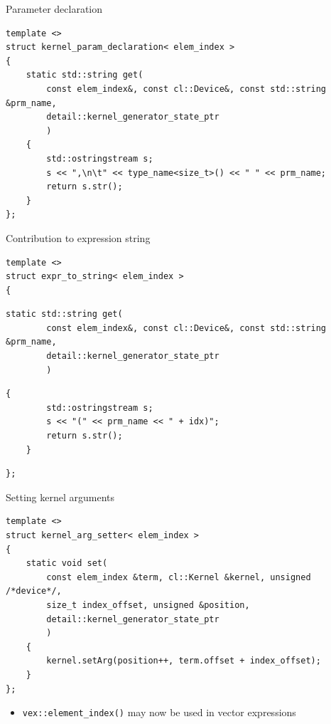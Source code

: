 \documentclass[@BEAMER_OPTIONS@]{beamer}
\newcommand{\code}[1]{\lstinline|#1|}
\begin{document}
\begin{frame}[fragile]{Parameter declaration}
    \begin{exampleblock}{}
        \begin{lstlisting}
template <>
struct kernel_param_declaration< elem_index >
{
    static std::string get(
        const elem_index&, const cl::Device&, const std::string &prm_name,
        detail::kernel_generator_state_ptr
        )
    {
        std::ostringstream s;
        s << ",\n\t" << type_name<size_t>() << " " << prm_name;
        return s.str();
    }
};
        \end{lstlisting}
    \end{exampleblock}
\end{frame}

\note{ }

\begin{frame}[fragile]{Contribution to expression string}
    \begin{exampleblock}{}
            \begin{lstlisting}
template <>
struct expr_to_string< elem_index >
{
    \end{lstlisting}
    \begin{lstlisting}[firstnumber=last]
    static std::string get(
        const elem_index&, const cl::Device&, const std::string &prm_name,
        detail::kernel_generator_state_ptr
        )
    \end{lstlisting}
    \begin{lstlisting}[firstnumber=last]
    {
        std::ostringstream s;
        s << "(" << prm_name << " + idx)";
        return s.str();
    }
    \end{lstlisting}
    \begin{lstlisting}[firstnumber=last]
};
            \end{lstlisting}
    \end{exampleblock}
\end{frame}

\note{ }

\begin{frame}[fragile]{Setting kernel arguments}
    \begin{exampleblock}{}
        \begin{lstlisting}
template <>
struct kernel_arg_setter< elem_index >
{
    static void set(
        const elem_index &term, cl::Kernel &kernel, unsigned /*device*/,
        size_t index_offset, unsigned &position,
        detail::kernel_generator_state_ptr
        )
    {
        kernel.setArg(position++, term.offset + index_offset);
    }
};
        \end{lstlisting}
    \end{exampleblock}
    \begin{itemize}
        \item \code{vex::element_index()} may now be used in vector expressions
    \end{itemize}
\end{frame}
\end{document}
